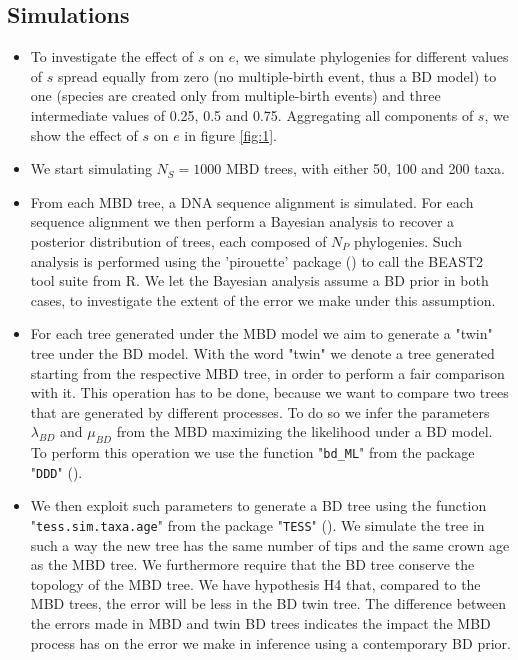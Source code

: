 \documentclass{article}
\begin{document}
\subsection{Simulations}
\begin{itemize}

\item To investigate the effect of $s$ on $e$, we simulate phylogenies
for different values of $s$ spread equally from zero (no multiple-birth
event, thus a BD model) to one (species are created only from multiple-birth
events) and three intermediate values of 0.25, 0.5 and 0.75. Aggregating all
components of $s$, we show the effect of $s$ on $e$ in figure \ref{fig:1}.

\item We start simulating $N_{S} = 1000$ MBD trees,
with either 50, 100 and 200 taxa.

\item From each MBD tree, a DNA sequence alignment is simulated. 
For each sequence alignment we then perform a Bayesian analysis 
to recover a posterior distribution of trees, 
each composed of $N_{P}$ phylogenies. 
Such analysis is performed using 
the 'pirouette' package (\cite{pirouette}) to call the BEAST2 tool 
suite from R. 
We let the Bayesian analysis assume a BD prior in both cases, 
to investigate the extent of the error we make under this assumption.

\item For each tree generated under the MBD model 
we aim to generate a "twin" tree under the BD model. 
With the word "twin" 
we denote a tree generated starting from the respective MBD tree, 
in order to perform a fair comparison with it. 
This operation has to be done, 
because we want to compare two trees 
that are generated by different processes. 
To do so we infer the parameters $\lambda_{BD}$ and $\mu_{BD}$ 
from the MBD maximizing the likelihood under a BD model. 
To perform this operation we use the function "\texttt{bd\_ML}" 
from the package "\texttt{DDD}" (\cite{etienne2012diversity}). 

\item We then exploit such parameters to generate a BD tree 
using the function "\texttt{tess.sim.taxa.age}" 
from the package "\texttt{TESS}" (\cite{Hoehna2013}). 
We simulate the tree in such a way the new tree 
has the same number of tips and the same crown age as the MBD tree. 
We furthermore require that the BD tree conserve the topology of the MBD tree.
We have hypothesis H4 that, compared to the MBD trees, 
the error will be less in the BD twin tree.
The difference between the errors made in MBD and twin BD trees indicates
the impact the MBD process has on the error we make in inference using a
contemporary BD prior.


\end{itemize}
\end{document}
